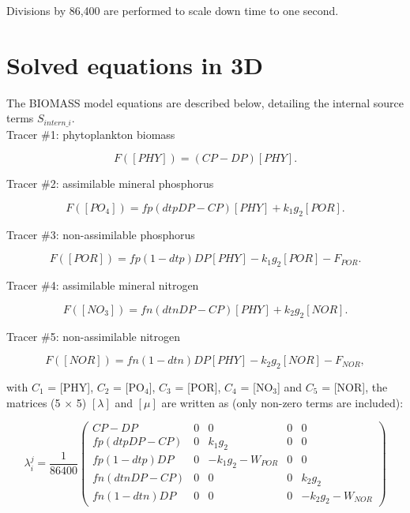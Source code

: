 Divisions by 86,400 are performed to scale down time to one second.

\section{Solved equations in 3D}

The BIOMASS model equations are described below, detailing the internal source terms $S_{intern\_i}$.\\

Tracer $\#$1: phytoplankton biomass

\begin{equation}
  F([PHY]) = (CP-DP) [PHY].
\end{equation}

Tracer $\#$2: assimilable mineral phosphorus

\begin{equation}
  F([PO_4]) = fp(dtp DP - CP) [PHY] + k_1 g_2 [POR].
\end{equation}

Tracer $\#$3: non-assimilable phosphorus

\begin{equation}
  F([POR]) = fp(1-dtp) DP [PHY] - k_1 g_2 [POR] - F_{POR}.
\end{equation}

Tracer $\#$4: assimilable mineral nitrogen

\begin{equation}
  F([NO_3]) = fn (dtn DP - CP) [PHY] + k_2 g_2 [NOR].
\end{equation}

Tracer $\#$5: non-assimilable nitrogen

\begin{equation}
  F([NOR]) = fn (1- dtn) DP [PHY] - k_2 g_2 [NOR] - F_{NOR},
\end{equation}

with $C_1$ = [PHY], $C_2$ = [PO$_4$], $C_3$ = [POR], $C_4$ = [NO$_3$] and $C_5$ = [NOR],
the matrices (5 $\times$ 5) $[\lambda]$ and $[\mu]$
are written as (only non-zero terms are included):

\begin{equation}
\lambda_i^j = \frac{1}{86400}
\left(
  \begin{array}{ccccc}
    CP-DP & 0 & 0 & 0 & 0 \\ %
    fp (dtp DP -CP) & 0 &  k_1 g_2 & 0 & 0 \\ %
    fp (1-dtp) DP   & 0 & -k_1 g_2 -W_{POR} & 0 & 0 \\ %
    fn (dtn DP -CP) & 0 &        0 & 0 &  k_2 g_2 \\ %
    fn (1-dtn) DP   & 0 &        0 & 0 & -k_2 g_2 - W_{NOR}
  \end{array}
\right)
\end{equation}

